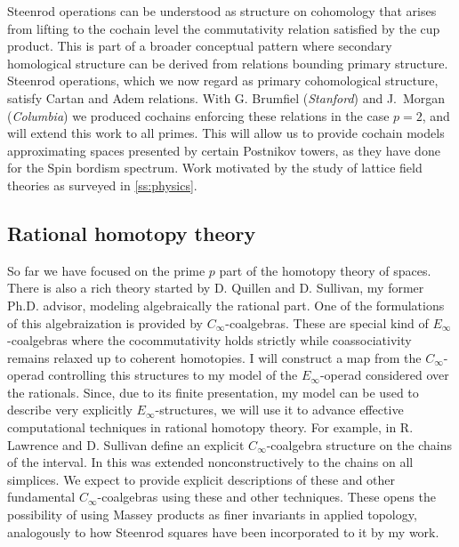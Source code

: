 Steenrod operations can be understood as structure on cohomology that arises from lifting to the cochain level the commutativity relation satisfied by the cup product.
This is part of a broader conceptual pattern where secondary homological structure can be derived from relations bounding primary structure.
Steenrod operations, which we now regard as primary cohomological structure, satisfy Cartan and Adem relations.
With G. Brumfiel (\textit{Stanford}) and J.~Morgan (\textit{Columbia}) we produced cochains enforcing these relations in the case $p=2$, and will extend this work to all primes.
This will allow us to provide cochain models approximating spaces presented by certain Postnikov towers, as they have done for the Spin bordism spectrum.
Work motivated by the study of lattice field theories as surveyed in \cref{ss:physics}.

\subsection{Rational homotopy theory}

So far we have focused on the prime $p$ part of the homotopy theory of spaces.
There is also a rich theory started by D. Quillen and D. Sullivan, my former Ph.D. advisor, modeling algebraically the rational part.
One of the formulations of this algebraization is provided by $C_\infty$-coalgebras.
These are special kind of $E_\infty$-coalgebras where the cocommutativity holds strictly while coassociativity remains relaxed up to coherent homotopies.
I will construct a map from the $C_\infty$-operad controlling this structures to my model of the $E_\infty$-operad \cite{medina2020prop1} considered over the rationals.
Since, due to its finite presentation, my model can be used to describe very explicitly $E_\infty$-structures, we will use it to advance effective computational techniques in rational homotopy theory.
For example, in \cite{lawrence2014interval} R. Lawrence and D. Sullivan define an explicit $C_\infty$-coalgebra structure on the chains of the interval.
In \cite{buijs2020liemodels} this was extended nonconstructively to the chains on all simplices.
We expect to provide explicit descriptions of these and other fundamental $C_\infty$-coalgebras using these and other techniques.
These opens the possibility of using Massey products as finer invariants in applied topology, analogously to how Steenrod squares have been incorporated to it by my work.